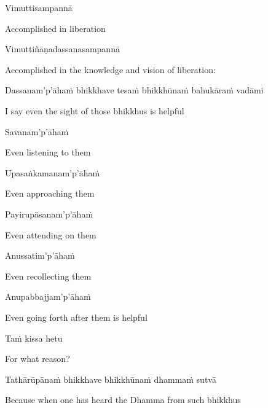 Vimuttisampannā

\begin{english}
  Accomplished in liberation
\end{english}

Vimuttiñāṇadassanasampannā

\begin{english}
  Accomplished in the knowledge and vision of liberation:
\end{english}

\begin{pali-hang}
  Dassanam'p'āhaṁ bhikkhave tesaṁ bhikkhūnaṁ bahukāraṁ vadāmi
\end{pali-hang}

\begin{english}
  I say even the sight of those bhikkhus is helpful
\end{english}

Savanam'p'āhaṁ

\begin{english}
  Even listening to them
\end{english}

Upasaṅkamanam'p'āhaṁ

\begin{english}
  Even approaching them
\end{english}

Payirupāsanam'p'āhaṁ

\begin{english}
  Even attending on them
\end{english}

Anussatim'p'āhaṁ

\begin{english}
  Even recollecting them
\end{english}

Anupabbajjam'p'āhaṁ

\begin{english}
  Even going forth after them is helpful
\end{english}

Taṁ kissa hetu

\begin{english}
  For what reason?
\end{english}

Tathārūpānaṁ bhikkhave bhikkhūnaṁ dhammaṁ sutvā

\begin{english}
  Because when one has heard the Dhamma from such bhikkhus
\end{english}

